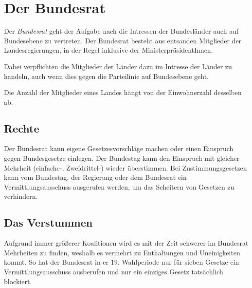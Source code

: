 \documentclass{article}
\begin{document}
\section{Der Bundesrat}
Der \emph{Bundesrat} geht der Aufgabe nach die Intressen der Bundesländer auch auf Bundesebene zu vertreten. Der Bundesrat besteht aus entsanden Mitglieder der Landesregierungen, in der Regel inklusive der MinisterpräsidentInnen.
 
Dabei verpflichten die Mitglieder der Länder dazu im Intresse der Länder zu handeln, auch wenn dies gegen die Parteilinie auf Bundesebene geht.
 
Die Anzahl der Mitglieder eines Landes hängt von der Einwohnerzahl desselben ab. 
 
\subsection{Rechte}
Der Bundesrat kann eigene Gesetzesvorschläge machen oder einen Einspruch gegen Bundesgesetze einlegen. Der Bundestag kann den Einspruch mit gleicher Mehrheit (einfache-, Zweidrittel-) wieder überstimmen. Bei Zustimmungsgesetzen kann vom Bundestag, der Regierung oder dem Bundesrat ein Vermittlungsausschuss ausgerufen werden, um das Scheitern von Gesetzen zu verhindern.
 
\subsection{Das Verstummen}
Aufgrund immer größerer Koalitionen wird es mit der Zeit schwerer im Bundesrat Mehrheiten zu finden, weshalb es vermehrt zu Enthaltungen und Uneinigkeiten kommt. So hat der Bundesrat in er $19.$ Wahlperiode nur für sieben Gesetze ein Vermittlungsausschuss ausberufen und nur ein einziges Gesetz tatsächlich blockiert.   
\end{document}

